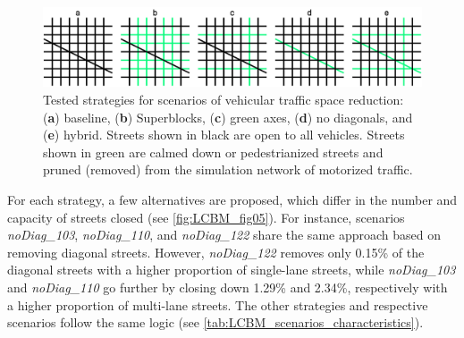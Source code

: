 \begin{figure}[htbp!]
    \centering
    \includegraphics[width=1\textwidth]{LCBM_fig04.jpg}
    \caption{Tested strategies for scenarios of vehicular traffic space reduction: (\textbf{a}) baseline, (\textbf{b}) Superblocks, (\textbf{c}) green axes, (\textbf{d}) no diagonals, and (\textbf{e}) hybrid. Streets shown in black are open to all vehicles. Streets shown in green are calmed down or pedestrianized streets and pruned (removed) from the simulation network of motorized traffic.}
   \label{fig:LCBM_fig04}
\end{figure}

For each strategy, a few alternatives are proposed, which differ in the number and capacity of streets closed (see \cref{fig:LCBM_fig05}). For instance, scenarios \emph{noDiag\_103}, \emph{noDiag\_110}, and \emph{noDiag\_122} share the same approach based on removing diagonal streets. However, \emph{noDiag\_122} removes only 0.15\% of the diagonal streets with a higher proportion of single-lane streets, while \emph{noDiag\_103} and \emph{noDiag\_110} go further by closing down 1.29\% and 2.34\%, respectively with a higher proportion of multi-lane streets. The other strategies and respective scenarios follow the same logic (see \cref{tab:LCBM_scenarios_characteristics}).



